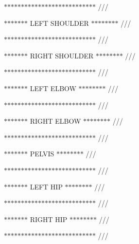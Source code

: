 $\ast$$\ast$$\ast$$\ast$$\ast$$\ast$$\ast$$\ast$$\ast$$\ast$$\ast$$\ast$$\ast$$\ast$$\ast$$\ast$$\ast$$\ast$$\ast$$\ast$$\ast$$\ast$$\ast$$\ast$$\ast$$\ast$$\ast$ ///

$\ast$$\ast$$\ast$$\ast$$\ast$$\ast$$\ast$ L\+E\+F\+T S\+H\+O\+U\+L\+D\+E\+R $\ast$$\ast$$\ast$$\ast$$\ast$$\ast$$\ast$$\ast$ ///

$\ast$$\ast$$\ast$$\ast$$\ast$$\ast$$\ast$$\ast$$\ast$$\ast$$\ast$$\ast$$\ast$$\ast$$\ast$$\ast$$\ast$$\ast$$\ast$$\ast$$\ast$$\ast$$\ast$$\ast$$\ast$$\ast$$\ast$ ///

$\ast$$\ast$$\ast$$\ast$$\ast$$\ast$$\ast$ R\+I\+G\+H\+T S\+H\+O\+U\+L\+D\+E\+R $\ast$$\ast$$\ast$$\ast$$\ast$$\ast$$\ast$$\ast$ ///

$\ast$$\ast$$\ast$$\ast$$\ast$$\ast$$\ast$$\ast$$\ast$$\ast$$\ast$$\ast$$\ast$$\ast$$\ast$$\ast$$\ast$$\ast$$\ast$$\ast$$\ast$$\ast$$\ast$$\ast$$\ast$$\ast$$\ast$ ///

$\ast$$\ast$$\ast$$\ast$$\ast$$\ast$$\ast$ L\+E\+F\+T E\+L\+B\+O\+W $\ast$$\ast$$\ast$$\ast$$\ast$$\ast$$\ast$$\ast$ ///

$\ast$$\ast$$\ast$$\ast$$\ast$$\ast$$\ast$$\ast$$\ast$$\ast$$\ast$$\ast$$\ast$$\ast$$\ast$$\ast$$\ast$$\ast$$\ast$$\ast$$\ast$$\ast$$\ast$$\ast$$\ast$$\ast$$\ast$ ///

$\ast$$\ast$$\ast$$\ast$$\ast$$\ast$$\ast$ R\+I\+G\+H\+T E\+L\+B\+O\+W $\ast$$\ast$$\ast$$\ast$$\ast$$\ast$$\ast$$\ast$ ///

$\ast$$\ast$$\ast$$\ast$$\ast$$\ast$$\ast$$\ast$$\ast$$\ast$$\ast$$\ast$$\ast$$\ast$$\ast$$\ast$$\ast$$\ast$$\ast$$\ast$$\ast$$\ast$$\ast$$\ast$$\ast$$\ast$$\ast$ ///

$\ast$$\ast$$\ast$$\ast$$\ast$$\ast$$\ast$ P\+E\+L\+V\+I\+S $\ast$$\ast$$\ast$$\ast$$\ast$$\ast$$\ast$$\ast$ ///

$\ast$$\ast$$\ast$$\ast$$\ast$$\ast$$\ast$$\ast$$\ast$$\ast$$\ast$$\ast$$\ast$$\ast$$\ast$$\ast$$\ast$$\ast$$\ast$$\ast$$\ast$$\ast$$\ast$$\ast$$\ast$$\ast$$\ast$ ///

$\ast$$\ast$$\ast$$\ast$$\ast$$\ast$$\ast$ L\+E\+F\+T H\+I\+P $\ast$$\ast$$\ast$$\ast$$\ast$$\ast$$\ast$$\ast$ ///

$\ast$$\ast$$\ast$$\ast$$\ast$$\ast$$\ast$$\ast$$\ast$$\ast$$\ast$$\ast$$\ast$$\ast$$\ast$$\ast$$\ast$$\ast$$\ast$$\ast$$\ast$$\ast$$\ast$$\ast$$\ast$$\ast$$\ast$ ///

$\ast$$\ast$$\ast$$\ast$$\ast$$\ast$$\ast$ R\+I\+G\+H\+T H\+I\+P $\ast$$\ast$$\ast$$\ast$$\ast$$\ast$$\ast$$\ast$ ///

$\ast$$\ast$$\ast$$\ast$$\ast$$\ast$$\ast$$\ast$$\ast$$\ast$$\ast$$\ast$$\ast$$\ast$$\ast$$\ast$$\ast$$\ast$$\ast$$\ast$$\ast$$\ast$$\ast$$\ast$$\ast$$\ast$$\ast$ ///

